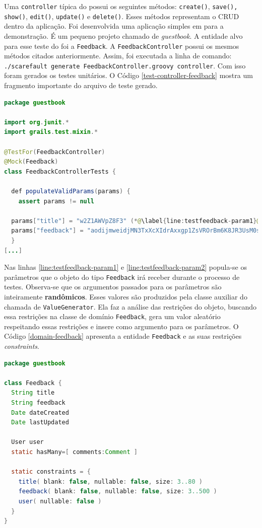 Uma \lstinline|controller| típica do \grails possui os seguintes métodos:
\lstinline|create()|, \lstinline|save(),| \lstinline|show()|, \lstinline|edit()|,
\lstinline|update()| e \lstinline|delete()|. Esses métodos representam
o CRUD dentro da aplicação. Foi desenvolvida uma aplicação simples em
\grails para a demonstração. É um pequeno projeto chamado de \textit{guestbook}.
A entidade alvo para esse teste do \framework foi a \lstinline|Feedback|.
A \lstinline|FeedbackController| possui os mesmos métodos citados anteriormente.
Assim, foi executada a linha de comando:
\lstinline|./scarefault generate FeedbackController.groovy controller|. Com isso
foram gerados os testes unitários. O Código \ref{test-controller-feedback}
mostra um fragmento importante do arquivo de teste gerado.
\begin{lstlisting}[language=java, label=test-controller-feedback, caption=Fragmento do arquivo de teste gerado para a \lstinline|FeedbackController|]
package guestbook

import org.junit.*
import grails.test.mixin.*

@TestFor(FeedbackController)
@Mock(Feedback)
class FeedbackControllerTests {

  def populateValidParams(params) {
    assert params != null

  params["title"] = "w2Z1AWVpZ8F3" (*@\label{line:testfeedback-param1}@*)
  params["feedback"] = "aodijmweidjMN3TxXcXIdrAxxgp1ZsVROrBm6K8JR3UsM0stcSFINRHL87O" (*@\label{line:testfeedback-param2}@*)
  }
[...]  
\end{lstlisting}

Nas linhas \ref{line:testfeedback-param1} e \ref{line:testfeedback-param2}
popula-se os parâmetros que o objeto do tipo \lstinline|Feedback| 
irá receber durante o processo de testes. Observa-se que os argumentos 
passados para os parâmetros são inteiramente \textbf{randômicos}.
Esses valores são produzidos pela classe auxiliar do \framework chamada
de \lstinline|ValueGenerator|. Ela faz a análise das restrições do objeto,
buscando essa restrições na classe de domínio \lstinline|Feedback|, gera
um valor aleatório respeitando essas restrições e insere como argumento
para os parâmetros. O Código \ref{domain-feedback} apresenta a entidade
\lstinline|Feedback| e as suas restrições \textit{constraints}.

\begin{lstlisting}[language=java, label=domain-feedback, caption=Arquivo de \lstinline|Feedback|]
package guestbook

class Feedback {
  String title
  String feedback
  Date dateCreated
  Date lastUpdated

  User user
  static hasMany=[ comments:Comment ]

  static constraints = {
    title( blank: false, nullable: false, size: 3..80 )
    feedback( blank: false, nullable: false, size: 3..500 )
    user( nullable: false )
  }
}

\end{lstlisting}

